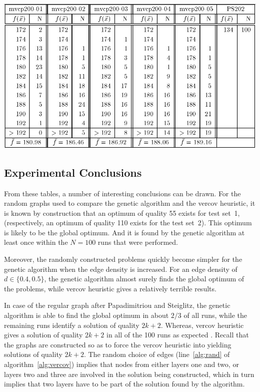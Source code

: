 \documentclass[12pt]{article}
\begin{document}
\begin{table}[!htbp]
\centering
\includegraphics[width=1\textwidth]{t4}
\caption[Results obtained by vercov heuristic for graphs in test set~2]{%
Experimental results obtained by the vercov heuristic for five random graphs of size $n = 200$ with edge density: $d = 0.1$ (``mvcp200-01''), $d = 0.2$ (``mvcp200-02''), $d = 0.3$ (``mvcp200-03''), $d = 0.5$ (``mvcp200-04''), $d = 0.5$ (``mvcp200-05'') and the regular graph of size $n = 202 \ (k=66)$ from Papadimitriou and Steiglitz (``PS202'').%
}
\label{tbl:t4}
\end{table}


\subsection{Experimental Conclusions}
From these tables, a number of interesting conclusions
can be drawn.
For the random graphs used to compare the
genetic algorithm and the vercov heuristic,
it is known by construction that an optimum of
quality 55 exists for test set~1,
(respectively, an optimum of quality 110 exists
for the test set~2).
This optimum is likely to be the global optimum.
And it is found by the genetic algorithm at least once
within the $N = 100$ runs that were performed.

Moreover, the randomly constructed problems quickly
become simpler for the genetic algorithm when the edge
density is increased.
For an edge density of $d \in \{0.4, 0.5\}$, the
genetic algorithm almost surely finds the global optimum
of the problems, while vercov heuristic gives
a relatively terrible results.

In case of the regular graph after Papadimitriou and
Steiglitz, the genetic algorithm is able to find the global
optimum in about $2/3$ of all runs, while the remaining
runs identify a solution of quality $2k + 2$.
Whereas, vercov heuristic gives a solution of
quality $2k + 2$ in all of the 100 runs as expected \cite{10:mvcp}.
Recall that the graphs are constructed
so as to force the vercov heuristic into yielding solutions
of quality $2k + 2$.
The random choice of edges (line~\ref{alg:rand} of algorithm~\ref{alg:vercov})
implies that nodes from either layers one and two, or layers two and three
are involved in the solution being constructed,
which in turn implies that two layers have to be part of the solution
found by the algorithm.
\end{document}
